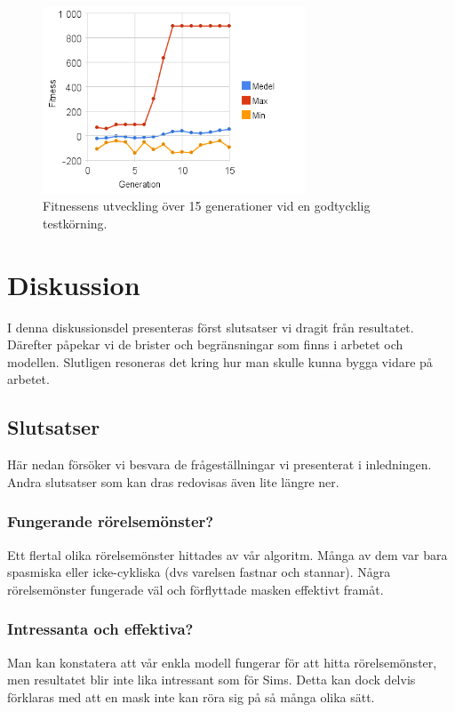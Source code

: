 \documentclass[titlepage, twocolumn, a4paper, 11pt, swedish]{article}
\begin{document}
\begin{figure}
    \includegraphics[width=78mm]{images/diagram_m01c08_2.png}
    \caption{Fitnessens utveckling över 15 generationer vid en godtycklig testkörning.}
    \label{fig:d3}
\end{figure}

\section{Diskussion}
I denna diskussionsdel presenteras först slutsatser vi dragit från resultatet. Därefter påpekar vi de brister och begränsningar som finns i arbetet och modellen. Slutligen resoneras det kring hur man skulle kunna bygga vidare på arbetet.

\subsection{Slutsatser}
Här nedan försöker vi besvara de frågeställningar vi presenterat i inledningen. Andra slutsatser som kan dras redovisas även lite längre ner.

\subsubsection{Fungerande rörelsemönster?}
Ett flertal olika rörelsemönster hittades av vår algoritm. Många av dem var bara spasmiska eller icke-cykliska (dvs varelsen fastnar och stannar). Några rörelsemönster fungerade väl och förflyttade masken effektivt framåt. 

\subsubsection{Intressanta och effektiva?}
Man kan konstatera att vår enkla modell fungerar för att hitta rörelsemönster, men resultatet blir inte lika intressant som för Sims. Detta kan dock delvis förklaras med att en mask inte kan röra sig på så många olika sätt.
\end{document}
